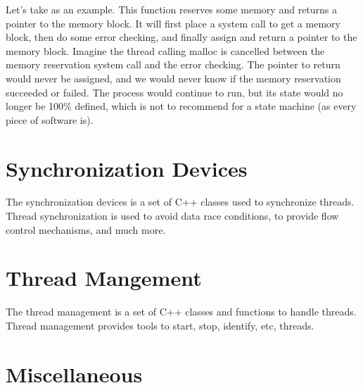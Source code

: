 Let's take  as an example. This function reserves some
memory and returns a pointer to the memory block. It will first place
a system call to get a memory block, then do some error checking, and
finally assign and return a pointer to the memory block. Imagine the
thread calling malloc is cancelled between the memory reservation
system call and the error checking. The pointer to return would never
be assigned, and we would never know if the memory reservation
succeeded or failed. The process would continue to run, but its state
would no longer be 100\% defined, which is not to recommend for a
state machine (as every piece of software is).

\chapter{Synchronization Devices}
\label{cha:Synchronization-Devices}

\manminitoc
\noindent
The synchronization devices is a set of C++ classes used to synchronize
threads. Thread synchronization is used to avoid data race conditions,
to provide flow control mechanisms, and much more.











\chapter{Thread Mangement}
\label{cha:Thread-Management}

\manminitoc
\noindent
The thread management is a set of C++ classes and functions to handle
threads. Thread management provides tools to start, stop, identify,
etc, threads.








\chapter{Miscellaneous}
\label{cha:Miscellaneous}

